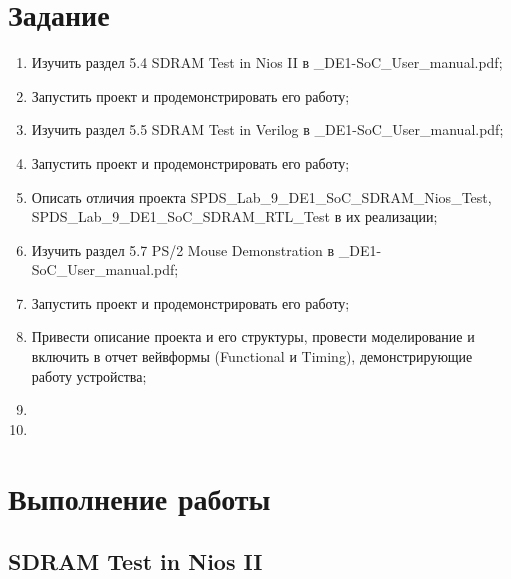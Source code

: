 \documentclass[a4paper,14pt]{article}
\begin{document}
	
	\tableofcontents
	\pagebreak
	\section{Задание}
	
	\begin{enumerate}
		
		\item Изучить раздел 5.4 SDRAM Test in Nios II в \_DE1-SoC\_User\_manual.pdf;
		
		\item Запустить проект и продемонстрировать его работу;
		
		\item Изучить раздел 5.5 SDRAM Test in Verilog в \_DE1-SoC\_User\_manual.pdf;
		
		\item Запустить проект и продемонстрировать его работу;
		
		\item Описать отличия проекта SPDS\_Lab\_9\_DE1\_SoC\_SDRAM\_Nios\_Test, SPDS\_Lab\_9\_DE1\_SoC\_SDRAM\_RTL\_Test в их реализации;
		
		\item Изучить раздел 5.7 PS/2 Mouse Demonstration в \_DE1-SoC\_User\_manual.pdf;
		
		\item Запустить проект и продемонстрировать его работу;
		
		\item Привести описание проекта и его структуры, провести моделирование и включить в отчет вейвформы (Functional и Timing), демонстрирующие работу устройства;
		
		\item
		
		\item
		
	\end{enumerate}
	\pagebreak
	
	\section{Выполнение работы}
	
	\subsection{SDRAM Test in Nios II} 
	
\end{document}
